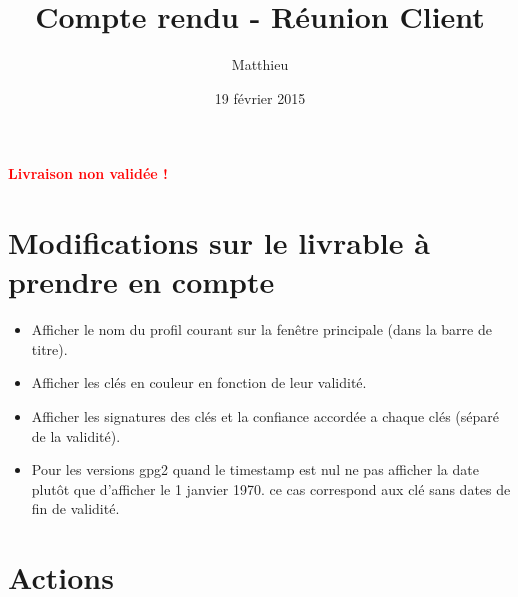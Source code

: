 \documentclass{CR-projet}
\title{Compte rendu - Réunion Client}
\author{Matthieu \bsc{FIN}}
\date{19 février 2015}
\begin{document}
\maketitle
\newpage

\newpage

\textbf{\Large \textcolor{red} {Livraison non validée !}}


\section{Modifications sur le livrable à prendre en compte}

\begin{itemize}
	\item Afficher le nom du profil courant sur la fenêtre principale (dans la barre de titre).
	\item Afficher les clés en couleur en fonction de leur validité.
	\item Afficher les signatures des clés et la confiance accordée a chaque clés (séparé de la validité).
	\item Pour les versions gpg2 quand le timestamp est nul ne pas afficher la date plutôt que d'afficher le 1 janvier 1970.
	ce cas correspond aux clé sans dates de fin de validité.
\end{itemize}

\section{Actions}
\end{document}
